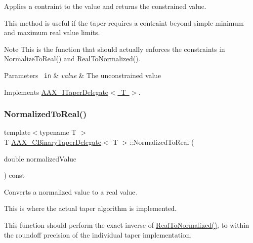 Applies a contraint to the value and returns the constrained value. 

This method is useful if the taper requires a contraint beyond simple minimum and maximum real value limits.

\begin{DoxyNote}{Note}
This is the function that should actually enforces the constraints in Normalize\+To\+Real() and \mbox{\hyperlink{a01457_aa27dfc33b38aef729c4cd499d90317a1}{Real\+To\+Normalized()}}.
\end{DoxyNote}

\begin{DoxyParams}[1]{Parameters}
\mbox{\texttt{ in}}  & {\em value} & The unconstrained value \\
\hline
\end{DoxyParams}


Implements \mbox{\hyperlink{a01881_a1de7acdc2b3e114b6686bf845c2465f1}{A\+A\+X\+\_\+\+I\+Taper\+Delegate$<$ T $>$}}.

\mbox{\label{a01457_ac50e2d93aeacf6a0293eb0098c8258ba}} 
\subsubsection{\texorpdfstring{NormalizedToReal()}{NormalizedToReal()}}
{\footnotesize\ttfamily template$<$typename T $>$ \\
T \mbox{\hyperlink{a01457}{A\+A\+X\+\_\+\+C\+Binary\+Taper\+Delegate}}$<$ T $>$\+::Normalized\+To\+Real (\begin{DoxyParamCaption}\item[{double}]{normalized\+Value }\end{DoxyParamCaption}) const\hspace{0.3cm}{\ttfamily [virtual]}}



Converts a normalized value to a real value. 

This is where the actual taper algorithm is implemented.

This function should perform the exact inverse of \mbox{\hyperlink{a01457_aa27dfc33b38aef729c4cd499d90317a1}{Real\+To\+Normalized()}}, to within the roundoff precision of the individual taper implementation.


